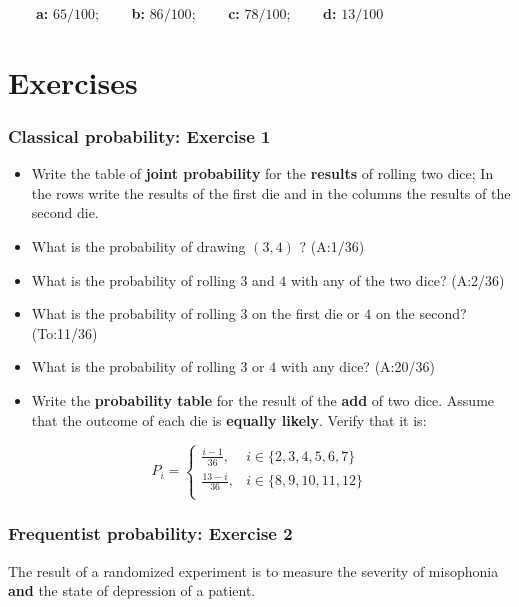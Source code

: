 \documentclass[
]{book}
\begin{document}
\textbf{\(\qquad\)a:} \(65/100\); \textbf{\(\qquad\)b:} \(86/100\); \textbf{\(\qquad\)c:} \(78/100\); \textbf{\(\qquad\)d:} \(13/100\)

\hypertarget{exercises-1}{%
\section{Exercises}\label{exercises-1}}

\hypertarget{classical-probability-exercise-1}{%
\subsubsection{Classical probability: Exercise 1}\label{classical-probability-exercise-1}}

\begin{itemize}
\item
  Write the table of \textbf{joint probability} for the \textbf{results} of rolling two dice; In the rows write the results of the first die and in the columns the results of the second die.
\item
  What is the probability of drawing \((3, 4)\) ? (A:1/36)
\item
  What is the probability of rolling \(3\) and \(4\) with any of the two dice? (A:2/36)
\item
  What is the probability of rolling \(3\) on the first die or \(4\) on the second? (To:11/36)
\item
  What is the probability of rolling \(3\) or \(4\) with any dice? (A:20/36)
\item
  Write the \textbf{probability table} for the result of the \textbf{add} of two dice. Assume that the outcome of each die is \textbf{equally likely}. Verify that it is:
\end{itemize}

\[
P_i=
\begin{cases}
\frac{i-1}{36},& i \in \{2,3,4,5,6, 7\} \\
\frac{13-i}{36},& i \in \{8,9,10,11,12\} \\
\end{cases}
\]

\hypertarget{frequentist-probability-exercise-2}{%
\subsubsection{Frequentist probability: Exercise 2}\label{frequentist-probability-exercise-2}}

The result of a randomized experiment is to measure the severity of misophonia \textbf{and} the state of depression of a patient.
\end{document}
